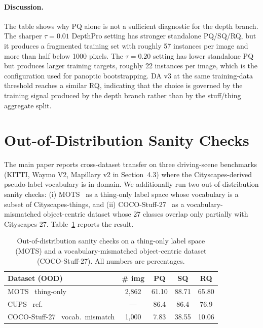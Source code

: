 \documentclass{article}
\begin{document}
\paragraph{Discussion.}
The table shows why PQ alone is not a sufficient diagnostic for the depth branch. The sharper $\tau{=}0.01$ DepthPro setting has stronger standalone PQ/SQ/RQ, but it produces a fragmented training set with roughly 57 instances per image and more than half below 1000 pixels. The $\tau{=}0.20$ setting has lower standalone PQ but produces larger training targets, roughly 22 instances per image, which is the configuration used for panoptic bootstrapping. DA v3 at the same training-data threshold reaches a similar RQ, indicating that the choice is governed by the training signal produced by the depth branch rather than by the stuff/thing aggregate split.

\section{Out-of-Distribution Sanity Checks}
\label{sec:supp:ood}

The main paper reports cross-dataset transfer on three driving-scene benchmarks (KITTI, Waymo V2, Mapillary v2 in Section~4.3) where the Cityscapes-derived pseudo-label vocabulary is in-domain. We additionally run two out-of-distribution sanity checks: (i) MOTS~\cite{voigtlaender2019mots} as a thing-only label space whose vocabulary is a subset of Cityscapes-things, and (ii) COCO-Stuff-27~\cite{caesar2018coco} as a vocabulary-mismatched object-centric dataset whose 27 classes overlap only partially with Cityscapes-27. Table~\ref{tab:cocooo} reports the result.

\begin{table}[H]
\caption{Out-of-distribution sanity checks on a thing-only label space (MOTS) and a vocabulary-mismatched object-centric dataset (COCO-Stuff-27). All numbers are percentages.}
\label{tab:cocooo}
\centering
\footnotesize
\setlength{\tabcolsep}{6pt}
\begin{tabular}{l c c c c}
\toprule
Dataset (OOD) & \# img & PQ & SQ & RQ \\
\midrule
MOTS~\cite{voigtlaender2019mots} thing-only & 2{,}862 & 61.10 & 88.71 & 65.80 \\
\quad CUPS~\cite{hahn2025cups} ref. & --- & 86.4 & 86.4 & 76.9 \\
COCO-Stuff-27~\cite{caesar2018coco} vocab.\ mismatch & 1{,}000 & \phantom{0}7.83 & 38.55 & 10.06 \\
\bottomrule
\end{tabular}
\end{table}
\end{document}
